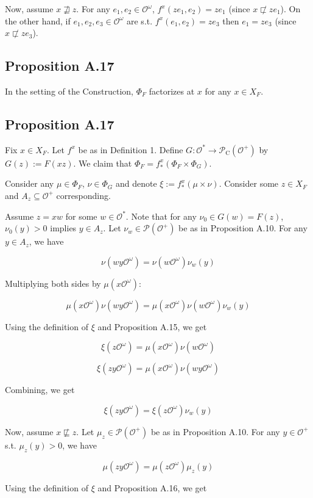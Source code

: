 \documentclass[a4paper]{article}
\newcommand{\Prob}{\mathcal{P}}
\newcommand{\Obs}{\mathcal{O}}
\newcommand{\ObsO}{\Obs^\omega}
\newcommand{\CC}{\mathcal{P}_{\operatorname{C}}}
\begin{document}
Now, assume ${x \not\sqsupseteq z}$. For any ${e_1,e_2 \in \ObsO}$, ${f^x(ze_1,e_2)=ze_1}$ (since ${x \not\sqsubset ze_1}$). On the other hand, if ${e_1,e_2,e_3 \in \ObsO}$ are s.t. ${f^x(e_1,e_2)=ze_3}$ then ${e_1 = ze_3}$ (since ${x \not\sqsubset ze_3}$).

\subsection{Proposition A.17}

In the setting of the Construction, ${\Phi_F}$ factorizes at ${x}$ for any ${x \in X_F}$.

\subsection{Proposition A.17}

Fix ${x \in X_F}$. Let ${f^x}$ be as in Definition 1. Define ${G: \Obs^* \rightarrow \CC(\Obs^+)}$ by ${G(z):=F(xz)}$. We claim that ${\Phi_F = f^x_*(\Phi_F \times \Phi_G)}$.

Consider any ${\mu \in \Phi_F}$, ${\nu \in \Phi_G}$ and denote ${\xi:=f^x_*(\mu \times \nu)}$. Consider some ${z \in X_F}$ and ${A_z \subseteq \Obs^+}$ corresponding.

Assume ${z = xw}$ for some ${w \in \Obs^*}$. Note that for any ${\nu_0 \in G(w)=F(z)}$, ${\nu_0(y) > 0}$ implies ${y \in A_z}$. Let ${\nu_w \in \Prob(\Obs^+)}$ be as in Proposition A.10. For any ${y \in A_z}$, we have

$$\nu(wy\ObsO) = \nu(w\ObsO) \nu_w(y)$$

Multiplying both sides by ${\mu(x\ObsO)}$:

$$\mu(x\ObsO) \nu(wy\ObsO) = \mu(x\ObsO) \nu(w\ObsO) \nu_w(y)$$

Using the definition of ${\xi}$ and Proposition A.15, we get

$${\xi(z\ObsO)=\mu(x\ObsO) \nu(w\ObsO)}$$

$$\xi(zy\ObsO) = \mu(x\ObsO) \nu(wy\ObsO)$$

Combining, we get

$$\xi(zy\ObsO) = \xi(z\ObsO) \nu_w(y)$$

Now, assume ${x \not\sqsubseteq z}$. Let ${\mu_z \in \Prob(\Obs^+)}$ be as in Proposition A.10. For any ${y \in \Obs^+}$ s.t. ${\mu_z(y) > 0}$, we have

$$\mu(zy\ObsO)=\mu(z\ObsO) \mu_z(y)$$

Using the definition of ${\xi}$ and Proposition A.16, we get
\end{document}
